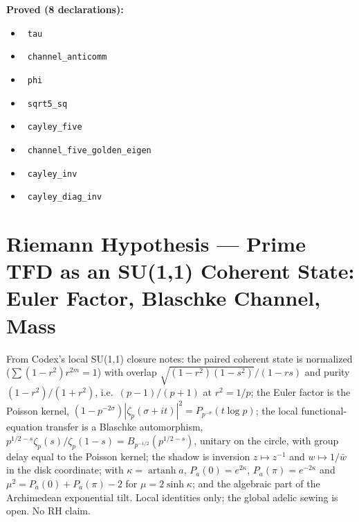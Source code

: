 \documentclass{report}
\theoremstyle{definition}
\begin{document}
\noindent\textbf{Proved (8 declarations):}
\begin{itemize}
  \item {}\leanok\ \texttt{tau}
  \item {}\leanok\ \texttt{channel\_anticomm}
  \item {}\leanok\ \texttt{phi}
  \item {}\leanok\ \texttt{sqrt5\_sq}
  \item {}\leanok\ \texttt{cayley\_five}
  \item {}\leanok\ \texttt{channel\_five\_golden\_eigen}
  \item {}\leanok\ \texttt{cayley\_inv}
  \item {}\leanok\ \texttt{cayley\_diag\_inv}
\end{itemize}

\section{Riemann Hypothesis --- Prime TFD as an SU(1,1) Coherent State: Euler Factor, Blaschke Channel, Mass}
From Codex's local SU(1,1) closure notes: the paired coherent state is normalized ($\sum(1-r^2)r^{2m}=1$) with overlap $\sqrt{(1-r^2)(1-s^2)}/(1-rs)$ and purity $(1-r^2)/(1+r^2)$, i.e.\ $(p-1)/(p+1)$ at $r^2=1/p$; the Euler factor is the Poisson kernel, $(1-p^{-2\sigma})|\zeta_p(\sigma+it)|^2=P_{p^{-\sigma}}(t\log p)$; the local functional-equation transfer is a Blaschke automorphism, $p^{1/2-s}\zeta_p(s)/\zeta_p(1-s)=B_{p^{-1/2}}(p^{1/2-s})$, unitary on the circle, with group delay equal to the Poisson kernel; the shadow is inversion $z\mapsto z^{-1}$ and $w\mapsto 1/\bar w$ in the disk coordinate; with $\kappa=\operatorname{artanh}a$, $P_a(0)=e^{2\kappa}$, $P_a(\pi)=e^{-2\kappa}$ and $\mu^2=P_a(0)+P_a(\pi)-2$ for $\mu=2\sinh\kappa$; and the algebraic part of the Archimedean exponential tilt. Local identities only; the global adelic sewing is open. No RH claim.
\end{document}
